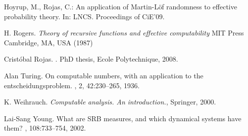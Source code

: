 \documentclass[copyright,creativecommons]{eptcs}
\numberwithin{equation}{section}
\begin{document}
\begin{thebibliography}{99}
 Hoyrup, M., Rojas, C.: \newblock An application of {M}artin-{L}\"of randomness to effective probability theory. \newblock In:
LNCS. Proceedings of CiE'09.

 H. Rogers. \emph{Theory of recursive functions and effective
computability} MIT Press Cambridge, MA, USA (1987)

 Crist\'{o}bal Rojas.
. \newblock PhD thesis, Ecole
Polytechnique, 2008.

 Alan Turing. \newblock On computable numbers, with an
application to the entscheidungsproblem.
, 2, 42:230--265, 1936.

 K. Weihrauch. \emph{Computable analysis. An introduction.},
Springer, 2000.

 Lai-Sang Young. \newblock What are {SRB} measures, and which
dynamical systems have them? , 108:733--754,
2002.
\end{thebibliography}
\end{document}
